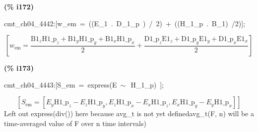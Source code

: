 \documentclass[fleqn]{article}
\begin{document}
\noindent
\begin{minipage}[t]{4.000000em}\color{red}\bfseries
(\% i172)	
\end{minipage}
\begin{minipage}[t]{\textwidth}\color{blue}
cmt\_ch04\_4442:[w\_em\ =\ ((E\_1\ .\ D\_1\_p\ )\ /\ 2)\ +\ ((H\_1\_p\ .\ B\_1)\ /2)];
\end{minipage}
\[\displaystyle \tag{\% o172} 
\left[ {w_{\ensuremath{\mathrm{em}}}}=\frac{{{\ensuremath{\mathrm{B1}}}_z} {{\ensuremath{\mathrm{H1\_ p}}}_z}+{{\ensuremath{\mathrm{B1}}}_y} {{\ensuremath{\mathrm{H1\_ p}}}_y}+{{\ensuremath{\mathrm{B1}}}_x} {{\ensuremath{\mathrm{H1\_ p}}}_x}}{2}+\frac{{{\ensuremath{\mathrm{D1\_ p}}}_z} {{\ensuremath{\mathrm{E1}}}_z}+{{\ensuremath{\mathrm{D1\_ p}}}_y} {{\ensuremath{\mathrm{E1}}}_y}+{{\ensuremath{\mathrm{D1\_ p}}}_x} {{\ensuremath{\mathrm{E1}}}_x}}{2}\right] \mbox{}
\]


\noindent
\begin{minipage}[t]{4.000000em}\color{red}\bfseries
(\% i173)	
\end{minipage}
\begin{minipage}[t]{\textwidth}\color{blue}
cmt\_ch04\_4443:[S\_em\ =\ express(E\ \ensuremath{\sim\ }\ H\_1\_p)\ ];
\end{minipage}
\[\displaystyle \tag{\% o173} 
\left[ {S_{\ensuremath{\mathrm{em}}}}=\left[ {E_y} {{\ensuremath{\mathrm{H1\_ p}}}_z}-{E_z} {{\ensuremath{\mathrm{H1\_ p}}}_y}\operatorname{,}{E_z} {{\ensuremath{\mathrm{H1\_ p}}}_x}-{E_x} {{\ensuremath{\mathrm{H1\_ p}}}_z}\operatorname{,}{E_x} {{\ensuremath{\mathrm{H1\_ p}}}_y}-{E_y} {{\ensuremath{\mathrm{H1\_ p}}}_x}\right] \right] \mbox{}
\]
Left out express(div()) here because avg\_t is not yet definedavg\_t(F, n) will be a time-averaged value of F over n time intervals)
\end{document}
